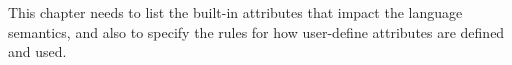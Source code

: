 
\begin{TODO}
This chapter needs to list the built-in attributes that impact the language semantics, and also to specify the rules for how user-define attributes are defined and used.
\end{TODO}
